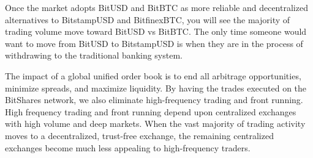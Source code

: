 Once the market adopts BitUSD and BitBTC as more reliable and decentralized
alternatives to BitstampUSD and BitfinexBTC, you will see the majority of
trading volume move toward BitUSD vs BitBTC. The only time someone would
want to move from BitUSD to BitstampUSD is when they are in the process of
withdrawing to the traditional banking system.

The impact of a global unified order book is to end all arbitrage
opportunities, minimize spreads, and maximize liquidity. By having the trades
executed on the BitShares network, we also eliminate high-frequency trading and
front running. High frequency trading and front running depend upon
centralized exchanges with high volume and deep markets. When the vast
majority of trading activity moves to a decentralized, trust-free exchange, the
remaining centralized exchanges become much less appealing to high-frequency
traders.
